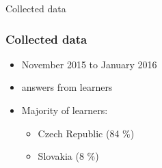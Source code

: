 \documentclass[bigger]{beamer}
\begin{document}
\begin{frame}
	\begin{center}
    {\Huge Collected data} 
	\end{center}
\end{frame}

\begin{frame}
	\frametitle{Collected data}
	\begin{itemize}
		\item November 2015 to January 2016
		\item {} answers from  learners
		\item Majority of learners:
			\begin{itemize}
				\item Czech Republic (84 \%)
				\item Slovakia (8 \%)
			\end{itemize}
	\end{itemize}
\end{frame}
\end{document}
